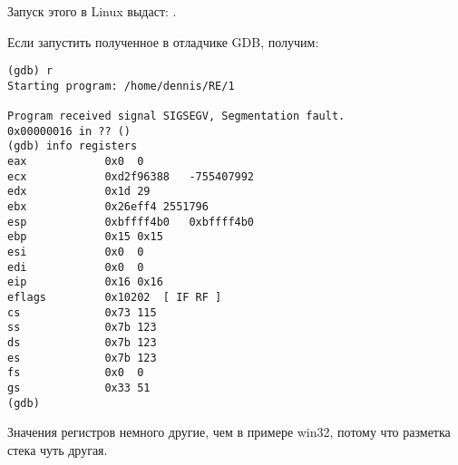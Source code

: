 Запуск этого в Linux выдаст: .

Если запустить полученное в отладчике GDB, получим:

\begin{lstlisting}
(gdb) r
Starting program: /home/dennis/RE/1 

Program received signal SIGSEGV, Segmentation fault.
0x00000016 in ?? ()
(gdb) info registers
eax            0x0	0
ecx            0xd2f96388	-755407992
edx            0x1d	29
ebx            0x26eff4	2551796
esp            0xbffff4b0	0xbffff4b0
ebp            0x15	0x15
esi            0x0	0
edi            0x0	0
eip            0x16	0x16
eflags         0x10202	[ IF RF ]
cs             0x73	115
ss             0x7b	123
ds             0x7b	123
es             0x7b	123
fs             0x0	0
gs             0x33	51
(gdb) 
\end{lstlisting}

Значения регистров немного другие, чем в примере win32, потому что разметка стека чуть другая.

